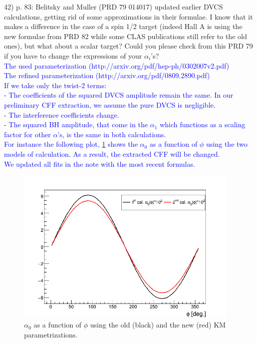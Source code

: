 42) p. 83: Belitsky and Muller (PRD 79 014017) updated earlier DVCS 
calculations, getting rid of some approximations in their formulae. I know that 
it makes a difference in the case of a spin 1/2 target (indeed Hall A is using 
the new formulae from PRD 82 while some CLAS publications still refer to the 
old ones), but what about a scalar target? Could you please check from this PRD 
79 if you have to change the expressions of your $\alpha_{i}$'s?\\
\textcolor{blue}{
The used parameterization  (http://arxiv.org/pdf/hep-ph/0302007v2.pdf)\\
The refined parameterization (http://arxiv.org/pdf/0809.2890.pdf)\\
  If we take only the twist-2 terms:\\
  - The coefficients of the squared DVCS amplitude remain the same. In our 
preliminary CFF extraction, we assume the pure DVCS is negligible. \\
  - The interference coefficients change.\\
  - The squared BH amplitude, that come in the $\alpha_{1}$ which functions as 
  a scaling factor for other $\alpha$'s, is the same in both calculations.\\
For instance the following plot, \ref{fig:alpha_zero} shows the $\alpha_{0}$ as 
a function of $\phi$ using the two models of calculation. As a result, the 
extracted CFF will be changed.\\
We updated all fits in the note with the most recent formulas.} \\

\begin{figure}[h!]
\centering
\includegraphics[height=7.5cm]{fig/alpha_0_two_models.png}
\caption{$\alpha_0$ as a function of $\phi$ using the old (black) and the new 
(red) KM parametrizations.}
\label{fig:alpha_zero}
 \end{figure}

